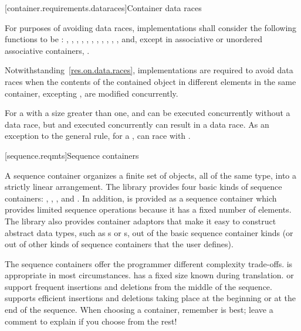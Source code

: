 [container.requirements.dataraces]{Container data races}

\pnum
For purposes of avoiding data races, implementations shall
consider the following functions to be : , ,
, , , , , ,
, , ,  and, except in
associative or unordered associative containers, .

\pnum
Notwithstanding~\ref{res.on.data.races}, implementations are required to avoid data
races when the contents of the contained object in different elements in the same
container, excepting , are modified concurrently.

\pnum
\begin{note}
For a  with a size greater than one, 
and  can be executed concurrently without a data race, but
 and  executed concurrently can result in a data
race.
As an exception to the general rule, for a , 
can race with .
\end{note}

[sequence.reqmts]{Sequence containers}

\pnum
A sequence container organizes a finite set of objects, all of the same type, into a strictly
linear arrangement. The library provides four basic kinds of sequence containers:
, , , and . In addition,
 is provided as a sequence container which provides limited sequence operations
because it has a fixed number of elements. The library also provides container adaptors that
make it easy to construct abstract data types, such as s or s, out of
the basic sequence container kinds (or out of other kinds of sequence containers that the user defines).

\pnum
\begin{note}
The sequence containers
offer the programmer different complexity trade-offs.
is appropriate in most circumstances.
has a fixed size known during translation.
 or 
support frequent insertions and deletions from the
middle of the sequence.
supports efficient insertions and deletions taking place at the beginning or at the
end of the sequence.
When choosing a container, remember  is best;
leave a comment to explain if you choose from the rest!
\end{note}

